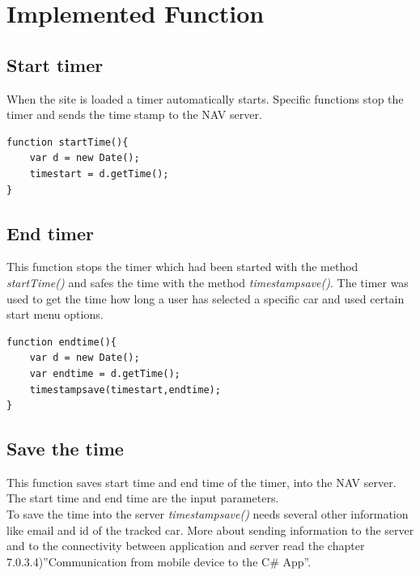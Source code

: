 \section{Implemented Function}


\subsection{Start timer}
When the site is loaded a timer automatically starts. Specific functions stop the timer and sends the time stamp to the NAV server.
\\
\begin{lstlisting}[language=html, caption= 
Start timer function,captionpos=b]
function startTime(){
	var d = new Date();
	timestart = d.getTime();
}
\end{lstlisting}

\subsection{End timer}
This function stops the timer which had been started with the method \textit{startTime()} and safes the time with the method \textit{timestampsave()}. The timer was used to get the time how long a user has selected a specific car and used certain start menu options.
\\

\begin{lstlisting}[language=html, caption= 
End timer function,captionpos=b]
function endtime(){
	var d = new Date();
	var endtime = d.getTime();
	timestampsave(timestart,endtime);
}
\end{lstlisting}


\subsection{Save the time}
This function saves start time and end time of the timer, into the NAV server. The start time and end time are the input parameters. 
\\


To save the time into the server \textit{timestampsave()} needs several other information like email and id of the tracked car. More about sending information to the server and  to the connectivity between application and server read the chapter 7.0.3.4)''Communication from mobile device to the C\# App''.
\\

